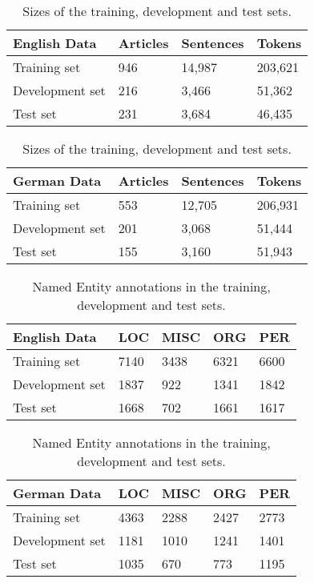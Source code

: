\documentclass[a4paper,10pt]{article}
\begin{document}
\begin{table}[h!]

\centering
 \begin{tabular}{l|l|l|l}
 \textbf{English Data}& Articles & Sentences & Tokens \\ \hline
 Training set &   946       &   14,987        &   203,621     \\
 Development set& 216        &  3,466         &    51,362     \\
 Test set       & 231        &   3,684        &     46,435    \\
  
 \end{tabular}

\vspace*{0.2cm}

 \begin{tabular}{l|l|l|l}
 \textbf{German Data} & Articles & Sentences & Tokens \\ \hline
 Training set &     553     &  12,705         &  206,931      \\ 
 Development set&    201     &  3,068         &  51,444       \\
 Test set       &    155     &   3,160        &   51,943      \\
  
 \end{tabular}
\caption{Sizes of the training, development and test sets.}
\label{table:input}

\end{table}


\begin{table}[h!]

\centering
 \begin{tabular}{l|l|l|l|l}
 \textbf{English Data} & LOC      & MISC     & ORG &PER       \\ \hline
 Training set &   7140       &  3438  & 6321     & 6600    \\
 Development set&  1837       &  922         &  1341    &  1842    \\
 Test set       &  1668       &   702        &   1661    &  1617   \\

 \end{tabular}

\vspace*{0.2cm}

\centering
 \begin{tabular}{l|l|l|l|l}
 \textbf{German Data} & LOC      & MISC     & ORG &PER       \\        \hline
 Training set &   4363       &   2288        & 2427     & 2773    \\
 Development set&  1181       &   1010        &  1241    &  1401    \\
 Test set       &   1035      &    670       &  773     &  1195   \\
  
 \end{tabular}
\caption{Named Entity annotations in the training, development and test sets.}
\label{table:output}

\end{table}
\end{document}
